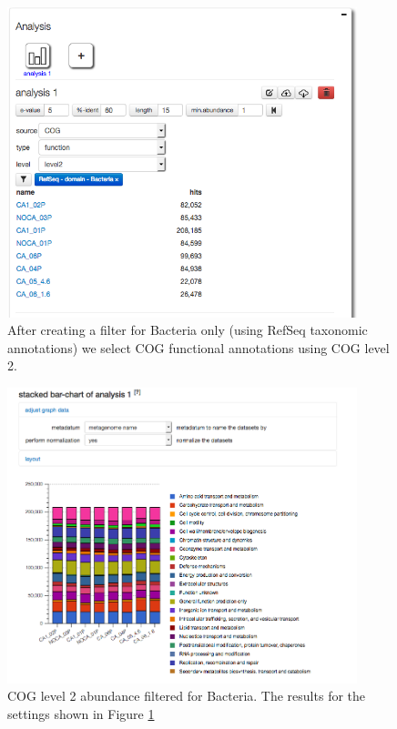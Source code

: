 \documentclass[12pt,fullpage]{report}
\begin{document}
\begin{figure}
\begin{center}
\includegraphics[width=4in]{Images/v4-Analysis-page-COG-Level2-for-Bacteria-settings.png}
\end{center}
\caption{
After creating a filter for Bacteria only (using RefSeq taxonomic annotations) we select COG functional annotations using COG level 2.
}
\label{fig:v4-Analysis-page-COG-Level2-for-Bacteria-settings}
\end{figure}


\begin{figure}
\begin{center}
\includegraphics[width=4in]{Images/v4-Analysis-page-COG-Level2-for-Bacteria-results.png}
\end{center}
\caption{
COG level 2 abundance filtered for Bacteria.
The results for the settings shown in Figure \ref{fig:v4-Analysis-page-COG-Level2-for-Bacteria-settings}
}
\label{fig:v4-Analysis-page-COG-Level2-for-Bacteria-results}
\end{figure}
\end{document}
